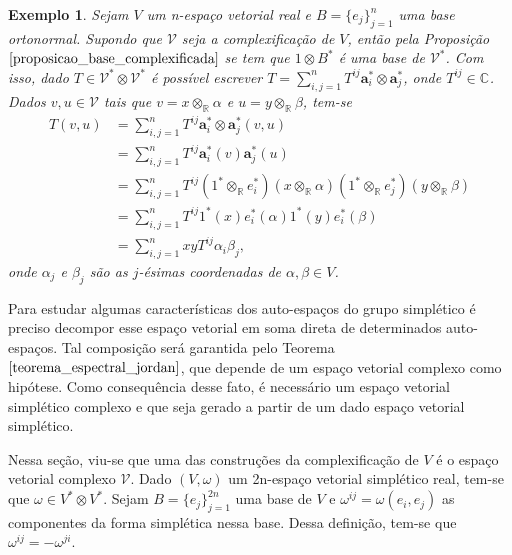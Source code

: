\documentclass[12pt]{book}
\newtheorem{exemplo}[teorema]{Exemplo}
\newcommand{\colecaofinita}[2]{\{#1_{j} \}_{j=1}^{#2}}
\newcommand{\complexificado}[1]{\mathcal{#1}}
\newcommand{\complexificacaoelemento}[2]{#1\otimes_{\reta} #2}
\newcommand{\complexo}[1]{\mathbb{C}^{#1}}
\newcommand{\produtotensorialabrev}[2]{#1\otimes #2}
\newcommand{\produtotensorialdual}{\produtotensorialabrev{\complexificado{V}^{*}}{\complexificado{V}^{*}}}
\newcommand{\real}[1]{\mathbb{R}^{#1}}
\newcommand{\reta}{\real{}}
\begin{document}
	\begin{exemplo}\label{exemplo_complexificacao_tensorial}
		Sejam $V$ um n-espaço vetorial real e $B = \colecaofinita{e}{n}$ uma base ortonormal. Supondo que $\complexificado{V}$ seja a complexificação de $V$, então pela Proposição $\ref{proposicao_base_complexificada}$ se tem que $1\otimes B^{*}$ é uma base de $\complexificado{V}^{*}$. Com isso, dado $T \in \produtotensorialdual$ é possível escrever $T = \sum_{i,j = 1}^{n} T^{ij}\textbf{a}^{*}_{i}\otimes \textbf{a}^{*}_{j}$, onde $T^{ij} \in \complexo{}$. Dados $v, u\in \complexificado{V}$ tais que $v=\complexificacaoelemento{x}{\alpha}$ e $u=\complexificacaoelemento{y}{\beta}$, tem-se
		$$
		\begin{aligned}
		T(v,u) &= \sum_{i,j = 1}^{n}
		T^{ij}\textbf{a}^{*}_{i}\otimes \textbf{a}^{*}_{j}(v,u)
		\\
		&= \sum_{i,j = 1}^{n}
		T^{ij}\textbf{a}^{*}_{i}(v)\textbf{a}^{*}_{j}(u)
		\\
		&= \sum_{i,j = 1}^{n}
		T^{ij}(\complexificacaoelemento{1^{*}}{e^{*}_{i}})(\complexificacaoelemento{x}{\alpha})(\complexificacaoelemento{1^{*}}{e^{*}_{j}})(\complexificacaoelemento{y}{\beta})
		\\
		&= \sum_{i,j = 1}^{n}
		T^{ij}1^{*}(x)e^{*}_{i}(\alpha)1^{*}(y)e^{*}_{i}(\beta)
		\\
		&= \sum_{i,j = 1}^{n}
		xyT^{ij}\alpha_{i}\beta_{j},
		\end{aligned}
		$$ 
		onde $\alpha_{j}$ e $\beta_{j}$ são as $j$-ésimas coordenadas de $\alpha, \beta \in V$. 
	\end{exemplo}
	
	Para estudar algumas características dos auto-espaços do grupo simplético é preciso  decompor esse espaço vetorial em soma direta de determinados  auto-espaços. Tal composição será garantida pelo Teorema $\ref{teorema_espectral_jordan}$, que depende de um espaço vetorial complexo como hipótese. Como consequência desse fato, é necessário um espaço vetorial simplético complexo e que seja gerado a partir de um dado espaço vetorial simplético.
	
	Nessa seção, viu-se que uma das construções da complexificação de $V$ é o espaço vetorial complexo $\complexificado{V}$. Dado $(V, \omega)$ um 2n-espaço vetorial simplético real, tem-se que $\omega \in V^{*}\otimes V^{*}$. Sejam $B = \{e_{j}\}_{j=1}^{2n}$ uma base de $V$ e $\omega^{ij} = \omega(e_{i}, e_{j})$ as componentes da forma simplética nessa base. Dessa definição, tem-se que $\omega^{ij} = -\omega^{ji}$.
	
\end{document}
